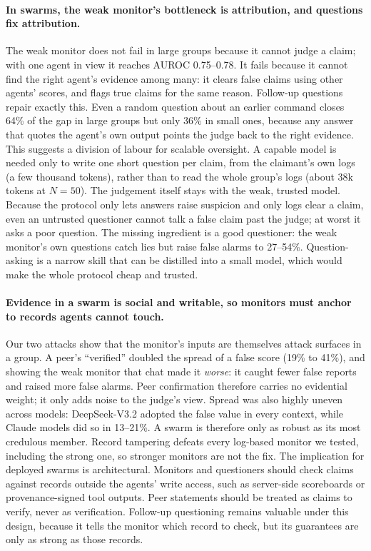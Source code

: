 \documentclass{article}
\begin{document}
\paragraph{In swarms, the weak monitor's bottleneck is attribution, and questions fix attribution.}
The weak monitor does not fail in large groups because it cannot judge a claim; with one agent in view it reaches AUROC 0.75--0.78.
It fails because it cannot find the right agent's evidence among many: it clears false claims using other agents' scores, and flags true claims for the same reason.
Follow-up questions repair exactly this.
Even a random question about an earlier command closes 64\% of the gap in large groups but only 36\% in small ones, because any answer that quotes the agent's own output points the judge back to the right evidence.
This suggests a division of labour for scalable oversight.
A capable model is needed only to write one short question per claim, from the claimant's own logs (a few thousand tokens), rather than to read the whole group's logs (about 38k tokens at $N{=}50$).
The judgement itself stays with the weak, trusted model.
Because the protocol only lets answers raise suspicion and only logs clear a claim, even an untrusted questioner cannot talk a false claim past the judge; at worst it asks a poor question.
The missing ingredient is a good questioner: the weak monitor's own questions catch lies but raise false alarms to 27--54\%.
Question-asking is a narrow skill that can be distilled into a small model, which would make the whole protocol cheap and trusted.

\paragraph{Evidence in a swarm is social and writable, so monitors must anchor to records agents cannot touch.}
Our two attacks show that the monitor's inputs are themselves attack surfaces in a group.
A peer's ``verified'' doubled the spread of a false score (19\% to 41\%), and showing the weak monitor that chat made it \emph{worse}: it caught fewer false reports and raised more false alarms.
Peer confirmation therefore carries no evidential weight; it only adds noise to the judge's view.
Spread was also highly uneven across models: DeepSeek-V3.2 adopted the false value in every context, while Claude models did so in 13--21\%.
A swarm is therefore only as robust as its most credulous member.
Record tampering defeats every log-based monitor we tested, including the strong one, so stronger monitors are not the fix.
The implication for deployed swarms is architectural.
Monitors and questioners should check claims against records outside the agents' write access, such as server-side scoreboards or provenance-signed tool outputs.
Peer statements should be treated as claims to verify, never as verification.
Follow-up questioning remains valuable under this design, because it tells the monitor which record to check, but its guarantees are only as strong as those records.
\end{document}
